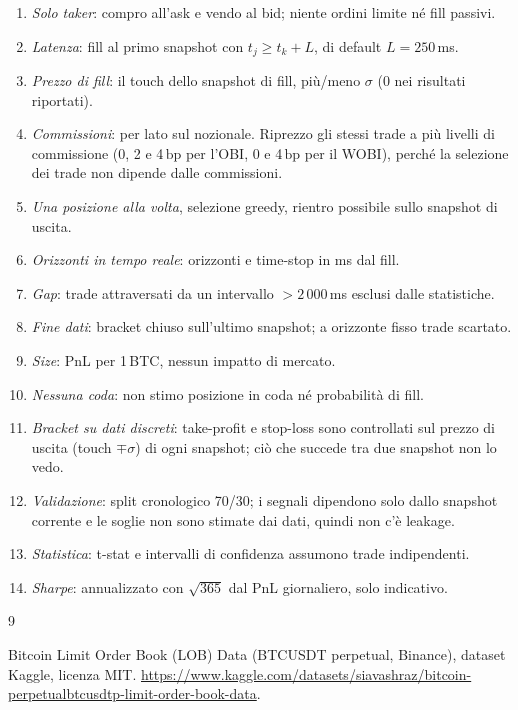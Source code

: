 \documentclass[a4paper,11pt]{article}
\newcommand{\bp}{\ensuremath{\,\mathrm{bp}}}
\begin{document}
\begin{enumerate}[label=\textbf{A\arabic*.}, leftmargin=*]
  \item \emph{Solo taker}: compro all'ask e vendo al bid; niente ordini limite né fill passivi.
  \item \emph{Latenza}: fill al primo snapshot con $t_j \ge t_k + L$, di default $L = 250$\,ms.
  \item \emph{Prezzo di fill}: il touch dello snapshot di fill, più/meno $\sigma$ (0 nei
        risultati riportati).
  \item \emph{Commissioni}: per lato sul nozionale. Riprezzo gli stessi trade a più livelli di
        commissione (0, 2 e 4\bp{} per l'OBI, 0 e 4\bp{} per il WOBI), perché la selezione dei
        trade non dipende dalle commissioni.
  \item \emph{Una posizione alla volta}, selezione greedy, rientro possibile sullo snapshot di
        uscita.
  \item \emph{Orizzonti in tempo reale}: orizzonti e time-stop in ms dal fill.
  \item \emph{Gap}: trade attraversati da un intervallo $>2\,000$\,ms esclusi dalle statistiche.
  \item \emph{Fine dati}: bracket chiuso sull'ultimo snapshot; a orizzonte fisso trade scartato.
  \item \emph{Size}: PnL per 1\,BTC, nessun impatto di mercato.
  \item \emph{Nessuna coda}: non stimo posizione in coda né probabilità di fill.
  \item \emph{Bracket su dati discreti}: take-profit e stop-loss sono controllati sul prezzo di
        uscita (touch $\mp\sigma$) di ogni snapshot; ciò che succede tra due snapshot non lo
        vedo.
  \item \emph{Validazione}: split cronologico 70/30; i segnali dipendono solo dallo snapshot
        corrente e le soglie non sono stimate dai dati, quindi non c'è leakage.
  \item \emph{Statistica}: t-stat e intervalli di confidenza assumono trade indipendenti.
  \item \emph{Sharpe}: annualizzato con $\sqrt{365}$ dal PnL giornaliero, solo indicativo.
\end{enumerate}

\begin{thebibliography}{9}

Bitcoin Limit Order Book (LOB) Data (BTCUSDT perpetual, Binance), dataset Kaggle, licenza MIT.
\url{https://www.kaggle.com/datasets/siavashraz/bitcoin-perpetualbtcusdtp-limit-order-book-data}.

\end{thebibliography}
\end{document}
